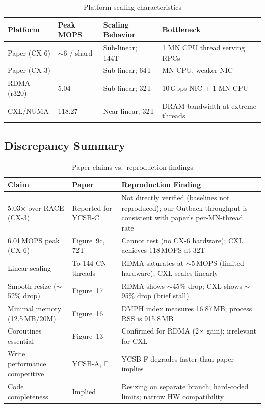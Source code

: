 \documentclass[conference]{IEEEtran}
\begin{document}
\begin{table}[H]
\centering
\caption{Platform scaling characteristics}
\label{tab:scaling}
\small
\begin{tabular}{@{}p{2.5cm}p{2cm}p{3.3cm}p{4.5cm}@{}}
\toprule
\textbf{Platform} & \textbf{Peak MOPS} & \textbf{Scaling Behavior} & \textbf{Bottleneck} \\
\midrule
Paper (CX-6) & $\sim$6 / shard & Sub-linear; 144T & 1 MN CPU thread serving RPCs \\
Paper (CX-3) & --- & Sub-linear; 64T & MN CPU, weaker NIC \\
RDMA (r320)  & 5.04 & Sub-linear; 32T & 10\,Gbps NIC + 1 MN CPU \\
CXL/NUMA     & 118.27 & Near-linear; 32T & DRAM bandwidth at extreme threads \\
\bottomrule
\end{tabular}
\end{table}

\subsection{Discrepancy Summary}

\begin{table}[H]
\centering
\caption{Paper claims vs.\ reproduction findings}
\label{tab:discrepancy}
\small
\begin{tabular}{@{}p{3.0cm}p{3.5cm}p{6cm}@{}}
\toprule
\textbf{Claim} & \textbf{Paper} & \textbf{Reproduction Finding} \\
\midrule
5.03$\times$ over RACE (CX-3) & Reported for YCSB-C & Not directly verified (baselines not reproduced); our Outback throughput is consistent with paper's per-MN-thread rate \\
6.01\,MOPS peak (CX-6) & Figure~9c, 72T & Cannot test (no CX-6 hardware); CXL achieves 118\,MOPS at 32T \\
Linear scaling & To 144 CN threads & RDMA saturates at $\sim$5\,MOPS (limited hardware); CXL scales linearly \\
Smooth resize ($\sim$52\% drop) & Figure~17 & RDMA shows $\sim$45\% drop; CXL shows $\sim$95\% drop (brief stall) \\
Minimal memory (12.5\,MB/20M) & Figure~16 & DMPH index measures 16.87\,MB; process RSS is 915.8\,MB \\
Coroutines essential & Figure~13 & Confirmed for RDMA (2$\times$ gain); irrelevant for CXL \\
Write performance competitive & YCSB-A, F & YCSB-F degrades faster than paper implies \\
Code completeness & Implied & Resizing on separate branch; hard-coded limits; narrow HW compatibility \\
\bottomrule
\end{tabular}
\end{table}
\end{document}
